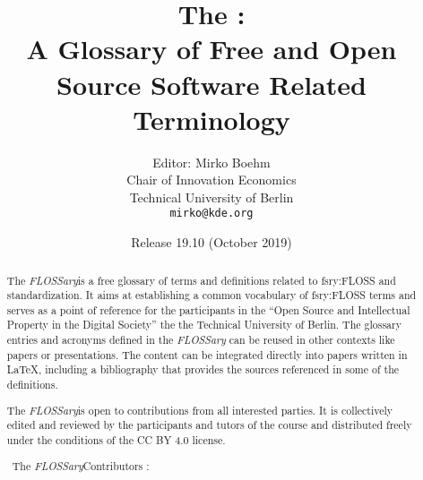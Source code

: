 \documentclass[a4paper]{article}
\title{The \flossary:\\
  A Glossary of Free and Open Source Software Related Terminology}
\author{Editor: Mirko Boehm\\
  Chair of Innovation Economics\\
  Technical University of Berlin\\
  \texttt{mirko@kde.org}}
\date{Release 19.10 (October 2019)}
\newcommand{\flossary}{{\em FLOSSary}{}}
\begin{document}
\maketitle \thispagestyle{empty}
\begin{abstract}
  \noindent
  The \flossary is a free glossary of terms and definitions related to
  \gls{fsry:FLOSS} and standardization. It aims at establishing a
  common vocabulary of \gls{fsry:FLOSS} terms and serves as a point of
  reference for the participants in the ``Open Source and Intellectual
  Property in the Digital Society'' the the Technical University of
  Berlin. The glossary entries and acronyms defined in the \flossary
  can be reused in other contexts like papers or presentations. The
  content can be integrated directly into papers written in \LaTeX,
  including a bibliography that provides the sources referenced in
  some of the definitions.

  The \flossary is open to contributions from all interested
  parties. It is collectively edited and reviewed by the participants
  and tutors of the course and distributed freely under the conditions
  of the CC BY 4.0 license.

  \vspace{0.5cm}
  \noindent \textcopyright~The \flossary Contributors \ccby:
  \\ 
\end{abstract}

\clearpage
\glsaddall
{}
\printnoidxglossary[nonumberlist]
\clearpage
\printnoidxglossary[type=\acronymtype,nonumberlist]
\clearpage
\printbibliography
\end{document}
